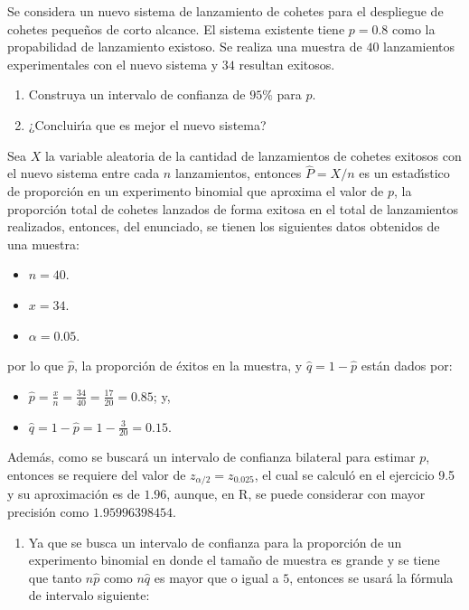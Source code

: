 \begin{enunciado}
 Se considera un nuevo sistema de lanzamiento de cohetes para el despliegue de cohetes peque\~nos de corto alcance. El sistema existente tiene $p = 0.8$ como la propabilidad de lanzamiento existoso. Se realiza una muestra de $40$ lanzamientos experimentales con el nuevo sistema y $34$ resultan exitosos.
 \begin{enumerate}
  \item Construya un intervalo de confianza de $95\%$ para $p$.
  \item ¿Concluir\'{\i}a que es mejor el nuevo sistema?
 \end{enumerate}
\end{enunciado}

\begin{solucion}
 Sea $X$ la variable aleatoria de la cantidad de lanzamientos de cohetes exitosos con el nuevo sistema entre cada $n$ lanzamientos, entonces $\widehat{P} = X/n$ es un estad\'{\i}stico de proporci\'on en un experimento binomial que aproxima el valor de $p$, la proporci\'on total de cohetes lanzados de forma exitosa en el total de lanzamientos realizados, entonces, del enunciado, se tienen los siguientes datos obtenidos de una muestra:
 \begin{itemize}
  \item $n = 40$.
  \item $x = 34$.
  \item $\alpha = 0.05$.
 \end{itemize}
 por lo que $\hat{p}$, la proporci\'on de \'exitos en la muestra, y $\hat{q} = 1 - \hat{p}$ est\'an dados por:
 \begin{itemize}
  \item $\hat{p} = \frac{x}{n} = \frac{34}{40} = \frac{17}{20} = 0.85$; y,
  \item $\hat{q} = 1-\hat{p} = 1 - \frac{3}{20} = 0.15$.
 \end{itemize}
 Adem\'as, como se buscar\'a un intervalo de confianza bilateral para estimar $p$, entonces se requiere del valor de $z_{\alpha/2} = z_{0.025}$, el cual se calcul\'o en el ejercicio 9.5 y su aproximaci\'on es de $1.96$, aunque, en R, se puede considerar con mayor precisi\'on como $1.95996398454$.
 \begin{enumerate}
  \item Ya que se busca un intervalo de confianza para la proporci\'on de un experimento binomial en donde el tama\~no de muestra es grande y se tiene que tanto $n\hat{p}$ como $n\hat{q}$ es mayor que o igual a $5$, entonces se usar\'a la f\'ormula de intervalo siguiente:

\end{enumerate}
\end{solucion}
